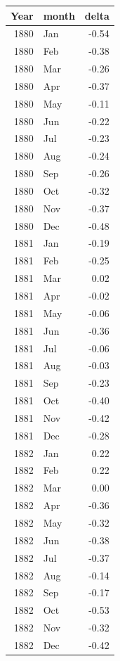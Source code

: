\documentclass[
]{article}
\begin{document}
\begin{table}[H]
\centering
\begin{tabular}[t]{r|l|r}
\hline
Year & month & delta\\
\hline
1880 & Jan & -0.54\\
\hline
1880 & Feb & -0.38\\
\hline
1880 & Mar & -0.26\\
\hline
1880 & Apr & -0.37\\
\hline
1880 & May & -0.11\\
\hline
1880 & Jun & -0.22\\
\hline
1880 & Jul & -0.23\\
\hline
1880 & Aug & -0.24\\
\hline
1880 & Sep & -0.26\\
\hline
1880 & Oct & -0.32\\
\hline
1880 & Nov & -0.37\\
\hline
1880 & Dec & -0.48\\
\hline
1881 & Jan & -0.19\\
\hline
1881 & Feb & -0.25\\
\hline
1881 & Mar & 0.02\\
\hline
1881 & Apr & -0.02\\
\hline
1881 & May & -0.06\\
\hline
1881 & Jun & -0.36\\
\hline
1881 & Jul & -0.06\\
\hline
1881 & Aug & -0.03\\
\hline
1881 & Sep & -0.23\\
\hline
1881 & Oct & -0.40\\
\hline
1881 & Nov & -0.42\\
\hline
1881 & Dec & -0.28\\
\hline
1882 & Jan & 0.22\\
\hline
1882 & Feb & 0.22\\
\hline
1882 & Mar & 0.00\\
\hline
1882 & Apr & -0.36\\
\hline
1882 & May & -0.32\\
\hline
1882 & Jun & -0.38\\
\hline
1882 & Jul & -0.37\\
\hline
1882 & Aug & -0.14\\
\hline
1882 & Sep & -0.17\\
\hline
1882 & Oct & -0.53\\
\hline
1882 & Nov & -0.32\\
\hline
1882 & Dec & -0.42\\

\end{tabular}
\end{table}
\end{document}
